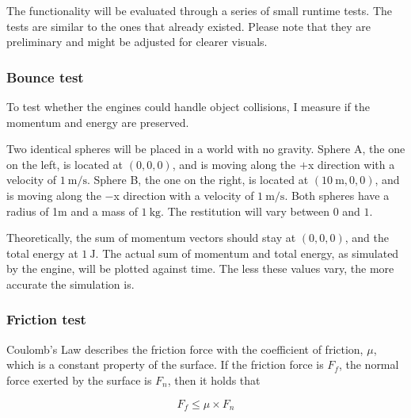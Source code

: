 \documentclass[12pt]{article}
\begin{document}
The functionality will be evaluated through a series of small runtime tests.
The tests are similar to the ones that already existed\cite{seugling2006evaluation}.
Please note that they are preliminary and might be adjusted for clearer visuals.

\subsubsection{Bounce test}

To test whether the engines could handle object collisions, I measure if the momentum and energy are preserved.

Two identical spheres will be placed in a world with no gravity. 
Sphere A, the one on the left, is located at $(0, 0, 0)$, and is moving along the $+$x direction with a velocity of $\SI{1}{\m\per\s}$.
Sphere B, the one on the right, is located at $(\SI{10}{\m}, 0, 0)$, and is moving along the $-$x direction with a velocity of $\SI{1}{\m\per\s}$.
Both spheres have a radius of 1m and a mass of $\SI{1}{\kg}$. The restitution will vary between $0$ and $1$.

\begin{center}
  \end{center}

Theoretically, the sum of momentum vectors should stay at $(0, 0, 0)$, and the total energy at $\SI{1}{\J}$.
The actual sum of momentum and total energy, as simulated by the engine, will be plotted against time.
The less these values vary, the more accurate the simulation is.

\subsubsection{Friction test}

Coulomb's Law describes the friction force with the coefficient of friction, $\mu$, which is a constant property of the surface.
If the friction force is $F_f$, the normal force exerted by the surface is $F_n$, then it holds that

\begin{equation}
F_f \leq \mu \times F_n
\end{equation}
\end{document}
